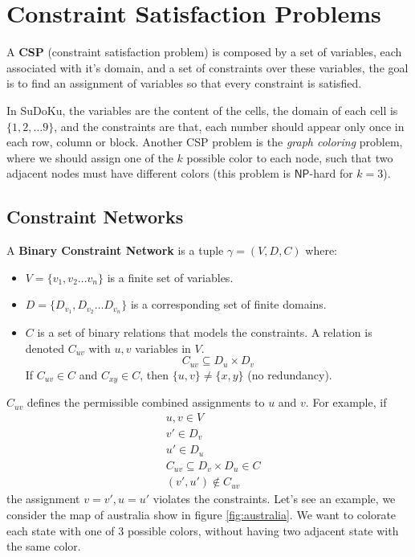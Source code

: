 \documentclass[10pt, letterpaper]{report}
\begin{document}
\chapter{Constraint Satisfaction Problems}
\begin{definition}
    A \textbf{CSP} (constraint satisfaction problem) is composed by a set of variables, each associated with it's domain, and a set of constraints over these variables, the goal is to find an assignment of variables so that every constraint is satisfied.
\end{definition}
In SuDoKu, the variables are the content of the cells, the domain of each cell is $\{1,2,\dots 9\}$, and the constraints are that, each number should appear only once in each row, column or block. Another CSP problem is the \textit{graph coloring} problem, where we should assign one of the $k$ possible color to each node, such that two adjacent nodes must have different colors (this problem is $\mathsf{NP}$-hard for $k=3$).
\section{Constraint Networks}
\begin{definition}
    A \textbf{Binary Constraint Network} is a tuple $\gamma=(V,D,C)$ where:
    \end{definition}\begin{itemize}
        \item $V=\{v_1,v_2\dots v_n\}$ is a finite set of variables. 
        \item $D=\{D_{v_1},D_{v_2}\dots D_{v_n}\}$ is a corresponding set of finite domains.
        \item $C$ is a set of binary relations that models the constraints. A relation is denoted $C_{uv}$ with $u,v$ variables in $V$. $$C_{uv}\subseteq D_u\times D_v$$If $C_{uv}\in C$ and $C_{xy}\in C$, then $\{u,v\}\ne \{x,y\}$ (no redundancy).
    \end{itemize}
    $C_{uv}$ defines the permissible combined assignments to $u$ and $v$. For example, if\begin{align}
        &u,v\in V\\
        &v'\in D_{v}\\ 
        &u' \in D_{u}\\ 
        & C_{uv}\subseteq D_{v}\times D_{u} \in C\\
        &(v',u')\notin C_{uv}
    \end{align}
the assignment $v=v', u=u'$ violates the constraints. Let's see an example, we consider the map of australia show in figure \ref{fig:australia}. We want to colorate each state with one of 3 possible colors, without having two adjacent state with the same color.\bigskip
\end{document}
